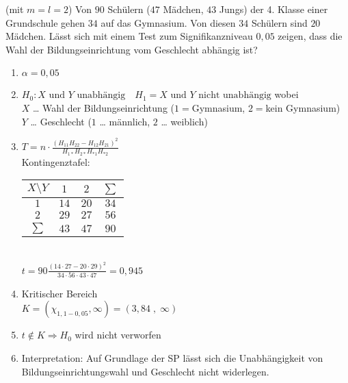 \documentclass{scrreprt}
\begin{document}
 (mit $m=l=2$) Von $90$ Schülern ($47$ Mädchen, $43$ Jungs) der 4. Klasse einer Grundschule gehen $34$ auf das Gymnasium. Von diesen $34$ Schülern sind $20$ Mädchen. Lässt sich mit einem Test zum Signifikanzniveau $0,05$ zeigen, dass die Wahl der Bildungseinrichtung vom Geschlecht abhängig ist?
\begin{enumerate}
\item $\alpha = 0,05$
\item $H_0: X\text{ und }Y\text{ unabhängig} \quad H_1=X \text{ und }Y \text{ nicht unabhängig}$ wobei \\
$X$ … Wahl der Bildungseinrichtung ($1=$Gymnasium, $2=$kein Gymnasium)\\
$Y$ … Geschlecht ($1$ … männlich, $2$ … weiblich)
\item $T=n\cdot \frac{(H_{11} H_{22}-H_{12}H_{21})^2}{H_{1*}H_{2*}H_{*1}H_{*2}}$\\
Kontingenztafel:\\
\begin{tabular}{c | c c | c}
$X\setminus Y$ & $1$ & $2$ & $\sum$\\\hline
$1$ & $14$ & $20$ & $34$\\
$2$ & $29$ & $27$ & $56$\\\hline
$\sum$& $43$ & $47$ & $90$
\end{tabular}\\
$t=90\frac{(14\cdot 27-20 \cdot 29)^2}{34\cdot 56 \cdot 43 \cdot 47}=0,945$
\item Kritischer Bereich\\
$K=(\chi_{1, 1-0,05}, \infty) = (3,84\;,\; \infty)$
\item $t\not \in K \Rightarrow H_0$ wird nicht verworfen
\item Interpretation: Auf Grundlage der SP lässt sich die Unabhängigkeit von Bildungseinrichtungswahl und Geschlecht nicht widerlegen.
\end{enumerate}
\end{document}
